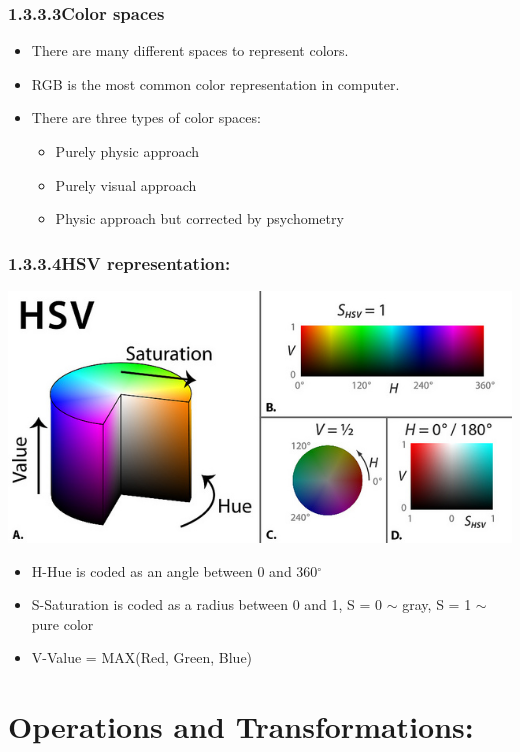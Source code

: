 \subsubsection*{1.3.3.3\hspace{0.5cm}Color spaces}
\begin{itemize}
\item There are many different spaces to represent colors.
\item RGB is the most common color representation in computer. 
\item There are three types of color spaces:
\begin{itemize}
\item Purely physic approach
\item Purely visual approach
\item Physic approach but corrected by psychometry
\end{itemize}
\end{itemize}
\subsubsection*{1.3.3.4\hspace{0.5cm}HSV representation:}
\begin{center}
\includegraphics[width=\textwidth]{hsv_colorspace.jpg}
\end{center}
\begin{itemize}
\item H-Hue is coded as an angle between 0 and 360$^{\circ}$
\item S-Saturation is coded as a radius between 0 and 1, S = 0 $\sim$ gray, S = 1 $\sim$ pure color
\item V-Value = MAX(Red, Green, Blue)
\end{itemize}
\section{Operations and Transformations:}
